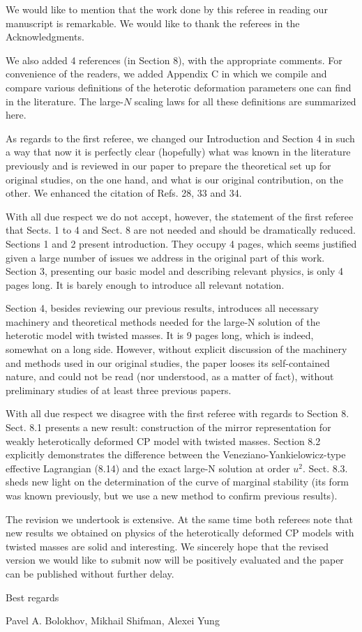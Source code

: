 \documentclass[a4paper,12pt]{article}
\begin{document}
We would like to mention that the work done  by this referee in reading 
our manuscript is remarkable. We would like to thank the referees in the 
Acknowledgments.

We also added 4 references (in Section 8), with the appropriate comments. 
For convenience of the readers, we added Appendix C in which we compile and 
compare various definitions of the heterotic deformation parameters one can 
find in the literature. The large-$N$ scaling laws for all these definitions 
are summarized here.

As regards to the first referee, we changed our Introduction and Section 4
in such a way that now it is perfectly clear (hopefully) what was known in 
the literature previously and is reviewed in our paper to prepare the theoretical 
set up for original studies, on the one hand, and what is our original 
contribution, on the other. We enhanced the citation of Refs. 28, 33 and 34.

With all due respect we  do not accept, however, the statement of the first 
referee that Sects. 1 to 4 and Sect. 8 are not needed and should be 
dramatically reduced. Sections 1 and 2 present introduction. They occupy 4 pages, 
which seems justified given a large number of issues we address in the original 
part of this work. Section 3, presenting our basic model and describing relevant 
physics, is only 4 pages long. It is barely enough to introduce all relevant 
notation.

Section 4, besides reviewing our previous results, introduces all necessary
machinery and theoretical methods needed for the large-N solution of the 
heterotic model with twisted masses. It is 9 pages long, which is indeed, 
somewhat on a long side. However, without explicit discussion of the machinery 
and methods used in our original studies, the paper looses its self-contained 
nature, and could not be read (nor understood, as a matter of fact), without 
preliminary studies of at least three previous papers.

With all due respect we disagree with the first referee with regards to
Section 8. Sect. 8.1 presents a new result: construction of the mirror 
representation for weakly heterotically deformed CP model with twisted masses. 
Section 8.2 explicitly demonstrates the difference between the 
Veneziano-Yankielowicz-type effective Lagrangian (8.14) and the exact large-N 
solution at order $u^2$. Sect. 8.3. sheds new light on the determination of 
the curve of marginal stability (its form was known previously, but we use a new 
method to confirm previous results).

The revision we undertook is extensive. At the same time both referees note that 
new results we obtained on physics of the heterotically deformed CP models with 
twisted masses are solid and interesting. We sincerely hope that the revised 
version we would like to submit now will be positively evaluated and the paper 
can be published without further delay.

\vspace{0.6cm}
Best regards

{\flushleft
Pavel A. Bolokhov, Mikhail Shifman, Alexei Yung
}
\end{document}
